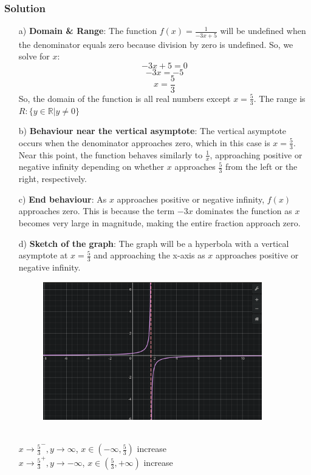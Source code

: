 \documentclass{article}
\begin{document}
\subsubsection*{Solution}
\begin{enumerate}
    \item[a)] \textbf{Domain \& Range}:
    The function \( f(x) = \frac{1}{-3x + 5} \) will be undefined when the denominator equals zero because division by zero is undefined. So, we solve for \( x \):
    \[ -3x + 5 = 0 \]
    \[ -3x = -5 \]
    \[ x = \frac{5}{3} \]
    So, the domain of the function is all real numbers except \( x = \frac{5}{3} \). 
    The range is $R: \{y \in \mathbb{R} | y \neq 0\}$
    
    \item[b)] \textbf{Behaviour near the vertical asymptote}:
    The vertical asymptote occurs when the denominator approaches zero, which in this case is \( x = \frac{5}{3} \). Near this point, the function behaves similarly to \( \frac{1}{x} \), approaching positive or negative infinity depending on whether \( x \) approaches \( \frac{5}{3} \) from the left or the right, respectively.
    
    \item[c)] \textbf{End behaviour}:
    As \( x \) approaches positive or negative infinity, \( f(x) \) approaches zero. This is because the term \( -3x \) dominates the function as \( x \) becomes very large in magnitude, making the entire fraction approach zero.
    
    \item[d)] \textbf{Sketch of the graph}:
    The graph will be a hyperbola with a vertical asymptote at \( x = \frac{5}{3} \) and approaching the x-axis as \( x \) approaches positive or negative infinity.
    \begin{figure}[ht]
    \centering
    \includegraphics[width=0.9\textwidth]{imgs/graph(1_3x+5).png}
    \end{figure}
    \\
    $x\to \frac{5}{3}^-, y\to \infty$, $x\in (-\infty,\frac{5}{3})$ increase\\
    $x \to \frac{5}{3}^+, y\to -\infty$, $x\in(\frac{5}{3}, +\infty)$ increase
\end{enumerate}
\end{document}
